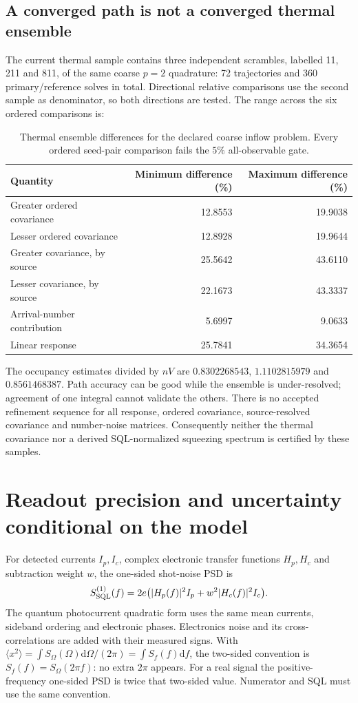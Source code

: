 \documentclass[11pt,a4paper]{article}
\newcommand{\dd}{\mathrm d}
\begin{document}
\subsection{A converged path is not a converged thermal ensemble}
The current thermal sample contains three independent scrambles, labelled
11, 211 and 811, of the same coarse $p=2$ quadrature: 72 trajectories and 360
primary/reference solves in total. Directional relative comparisons use the
second sample as denominator, so both directions are tested. The range across
the six ordered comparisons is:
\begin{table}[ht]
\centering\small
\caption{Thermal ensemble differences for the declared coarse inflow problem.
Every ordered seed-pair comparison fails the $5\%$ all-observable gate.}
\label{tab:gc-thermal-convergence}
\begin{tabular}{lrr}
\toprule
Quantity&Minimum difference (\%)&Maximum difference (\%)\\
\midrule
Greater ordered covariance&12.8553&19.9038\\
Lesser ordered covariance&12.8928&19.9644\\
Greater covariance, by source&25.5642&43.6110\\
Lesser covariance, by source&22.1673&43.3337\\
Arrival-number contribution&5.6997&9.0633\\
Linear response&25.7841&34.3654\\
\bottomrule
\end{tabular}
\end{table}
The occupancy estimates divided by $nV$ are $0.8302268543$, $1.1102815979$
and $0.8561468387$. Path accuracy can be good while the ensemble is
under-resolved; agreement of one integral cannot validate the others. There
is no accepted refinement sequence for all response, ordered covariance,
source-resolved covariance and number-noise matrices. Consequently neither
the thermal covariance nor a derived SQL-normalized squeezing spectrum is
certified by these samples.

\section{Readout precision and uncertainty conditional on the model}
\label{sec:gc-readout}

For detected currents $I_p,I_c$, complex electronic transfer functions $H_p,H_c$
and subtraction weight $w$, the one-sided shot-noise PSD is
\begin{equation}
 S_{\rm SQL}^{(1)}(f)=2e\bigl(|H_p(f)|^2I_p+w^2|H_c(f)|^2I_c\bigr).
 \label{eq:gc-sql}
\end{equation}
The quantum photocurrent quadratic form uses the same mean currents,
sideband ordering and electronic phases. Electronics noise and its
cross-correlations are added with their measured signs. With
$\langle x^2\rangle=\int S_\Omega(\Omega)\dd\Omega/(2\pi)
=\int S_f(f)\dd f$, the two-sided convention is
$S_f(f)=S_\Omega(2\pi f)$: no extra $2\pi$ appears. For a real signal the
positive-frequency one-sided PSD is twice that two-sided value. Numerator
and SQL must use the same convention.
\end{document}

